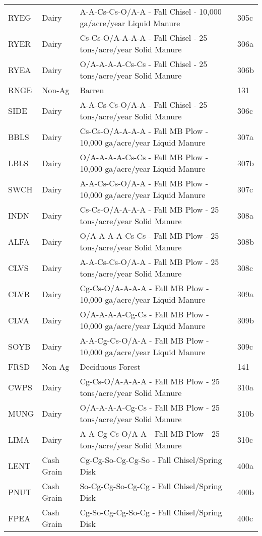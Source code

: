 \begin{longtable}{llll}
  RYEG & Dairy & A-A-Cs-Cs-O/A-A - Fall Chisel - 10,000 ga/acre/year Liquid Manure & 305c \\ 
  RYER & Dairy & Cs-Cs-O/A-A-A-A - Fall Chisel - 25 tons/acre/year Solid Manure & 306a \\ 
  RYEA & Dairy & O/A-A-A-A-Cs-Cs - Fall Chisel - 25 tons/acre/year Solid Manure & 306b \\ 
  RNGE & Non-Ag & Barren & 131 \\ 
  SIDE & Dairy & A-A-Cs-Cs-O/A-A - Fall Chisel - 25 tons/acre/year Solid Manure & 306c \\ 
  BBLS & Dairy & Cs-Cs-O/A-A-A-A - Fall MB Plow - 10,000 ga/acre/year Liquid Manure & 307a \\ 
  LBLS & Dairy & O/A-A-A-A-Cs-Cs - Fall MB Plow - 10,000 ga/acre/year Liquid Manure & 307b \\ 
  SWCH & Dairy & A-A-Cs-Cs-O/A-A - Fall MB Plow - 10,000 ga/acre/year Liquid Manure & 307c \\ 
  INDN & Dairy & Cs-Cs-O/A-A-A-A - Fall MB Plow - 25 tons/acre/year Solid Manure & 308a \\ 
  ALFA & Dairy & O/A-A-A-A-Cs-Cs - Fall MB Plow - 25 tons/acre/year Solid Manure & 308b \\ 
  CLVS & Dairy & A-A-Cs-Cs-O/A-A - Fall MB Plow - 25 tons/acre/year Solid Manure & 308c \\ 
  CLVR & Dairy & Cg-Cs-O/A-A-A-A - Fall MB Plow - 10,000 ga/acre/year Liquid Manure & 309a \\ 
  CLVA & Dairy & O/A-A-A-A-Cg-Cs - Fall MB Plow - 10,000 ga/acre/year Liquid Manure & 309b \\ 
  SOYB & Dairy & A-A-Cg-Cs-O/A-A - Fall MB Plow - 10,000 ga/acre/year Liquid Manure & 309c \\ 
  FRSD & Non-Ag & Deciduous Forest & 141 \\ 
  CWPS & Dairy & Cg-Cs-O/A-A-A-A - Fall MB Plow - 25 tons/acre/year Solid Manure & 310a \\ 
  MUNG & Dairy & O/A-A-A-A-Cg-Cs - Fall MB Plow - 25 tons/acre/year Solid Manure & 310b \\ 
  LIMA & Dairy & A-A-Cg-Cs-O/A-A - Fall MB Plow - 25 tons/acre/year Solid Manure & 310c \\ 
  LENT & Cash Grain & Cg-Cg-So-Cg-Cg-So - Fall Chisel/Spring Disk & 400a \\ 
  PNUT & Cash Grain & So-Cg-Cg-So-Cg-Cg - Fall Chisel/Spring Disk & 400b \\ 
  FPEA & Cash Grain & Cg-So-Cg-Cg-So-Cg - Fall Chisel/Spring Disk & 400c \\ 

\end{longtable}
